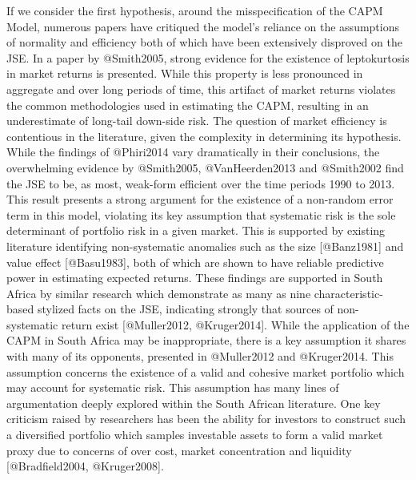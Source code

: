 \documentclass[11pt]{article}
\begin{document}
If we consider the first hypothesis, around the misspecification of the
CAPM Model, numerous papers have critiqued the model's reliance on the
assumptions of normality and efficiency both of which have been
extensively disproved on the JSE. In a paper by @Smith2005, strong
evidence for the existence of leptokurtosis in market returns is
presented. While this property is less pronounced in aggregate and over
long periods of time, this artifact of market returns violates the
common methodologies used in estimating the CAPM, resulting in an
underestimate of long-tail down-side risk. The question of market
efficiency is contentious in the literature, given the complexity in
determining its hypothesis. While the findings of @Phiri2014 vary
dramatically in their conclusions, the overwhelming evidence by
@Smith2005, @VanHeerden2013 and @Smith2002 find the JSE to be, as most,
weak-form efficient over the time periods 1990 to 2013. This result
presents a strong argument for the existence of a non-random error term
in this model, violating its key assumption that systematic risk is the
sole determinant of portfolio risk in a given market. This is supported
by existing literature identifying non-systematic anomalies such as the
size {[}@Banz1981{]} and value effect {[}@Basu1983{]}, both of which are
shown to have reliable predictive power in estimating expected returns.
These findings are supported in South Africa by similar research which
demonstrate as many as nine characteristic-based stylized facts on the
JSE, indicating strongly that sources of non-systematic return exist
{[}@Muller2012, @Kruger2014{]}. While the application of the CAPM in
South Africa may be inappropriate, there is a key assumption it shares
with many of its opponents, presented in @Muller2012 and @Kruger2014.
This assumption concerns the existence of a valid and cohesive market
portfolio which may account for systematic risk. This assumption has
many lines of argumentation deeply explored within the South African
literature. One key criticism raised by researchers has been the ability
for investors to construct such a diversified portfolio which samples
investable assets to form a valid market proxy due to concerns of over
cost, market concentration and liquidity {[}@Bradfield2004,
@Kruger2008{]}.
\end{document}
